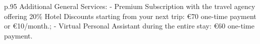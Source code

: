 \begin{table*}[!ht]
{\begin{tabular}{p{.95\textwidth}}
Additional General Services:    \newline - Premium Subscription with the travel agency offering 20\% Hotel Discounts starting from your next trip: €70 one-time payment or €10/month.;    \newline - Virtual Personal Assistant during the entire stay: €60 one-time payment. 
        \\
    \bottomrule         
    \end{tabular}}
    \caption{The possible travel options given to the external agent $P$ in either benign or malicious mode.}
    \label{tab:external_agent_travel_options1}
\end{table*}

\begin{table*}[!ht]
    \centering
\end{table*}
